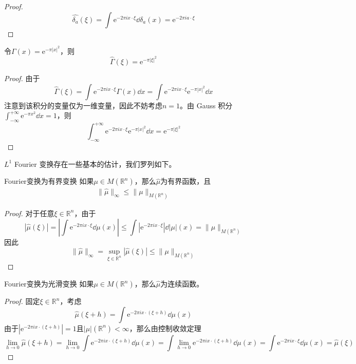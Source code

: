 \documentclass[lang = cn, %
scheme = chinese          %
]
{elegantbook}             %
\newcommand{\R}{\mathbb{R}}            %
\newcommand{\ee}[1]{\mathrm{e}^{#1}}           %
\newcommand{\dis}{\displaystyle}
\begin{document}
\begin{proof}
	\[
	\widehat{\delta_a}(\xi)
	=\int\ee{-2\pi i x \cdot \xi}\dd \delta_a(x)
	=\ee{-2\pi i a\cdot \xi}
	\]
\end{proof}

\begin{example}
	令$\Gamma(x)=\ee{-\pi|x|^2}$，则
	\[
	\widehat{\Gamma}(\xi)=\ee{-\pi|\xi|^2}
	\]
\end{example}

\begin{proof}
	由于
	\[
	\widehat{\Gamma}(\xi)
	=\int\ee{-2\pi i x \cdot \xi}\Gamma(x)\dd x
	=\int\ee{-2\pi i x \cdot \xi}\ee{-\pi|x|^2}\dd x
	\]
	注意到该积分的变量仅为一维变量，因此不妨考虑$n=1$。由 Gauss 积分$\dis \int_{-\infty}^{+\infty}\ee{-\pi x^2}\dd x=1$，则
	\[
	\int_{-\infty}^{+\infty}\ee{-2\pi i x \cdot \xi}\ee{-\pi|x|^2}\dd x
	=\ee{-\pi|\xi|^2}
	\]
\end{proof}

$L^1$ Fourier 变换存在一些基本的估计，我们罗列如下。

\begin{proposition}{}{Fourier变换为有界变换}
	如果$\mu\in M(\R^n)$，那么$\widehat{\mu}$为有界函数，且
	\begin{gather}
		\label{2式}
		\|\widehat{\mu}\|_{\infty}
		\le\|\mu\|_{M(\R^n)}
	\end{gather}
\end{proposition}

\begin{proof}
	对于任意$\xi\in\R^n$，由于
	\[
	|\widehat{\mu}(\xi)|
	=\left| \int\ee{-2\pi i x \cdot \xi}\dd\mu(x) \right|
	\le\int|\ee{-2\pi i x \cdot \xi}|\dd|\mu|(x)
	=\|\mu\|_{M(\R^n)}
	\]
	因此
	\[
	\|\widehat{\mu}\|_{\infty}
	=\sup_{\xi\in\R^n}|\widehat{\mu}(\xi)|
	\le\|\mu\|_{M(\R^n)}
	\]
\end{proof}

\begin{proposition}{}{Fourier变换为光滑变换}
	如果$\mu\in M(\R^n)$，那么$\widehat{\mu}$为连续函数。
\end{proposition}

\begin{proof}
	固定$\xi\in\R^n$，考虑
	\[
	\widehat{\mu}(\xi+h)
	=\int\ee{-2\pi i x \cdot (\xi+h)}\dd\mu(x)
	\]
	由于$|\ee{-2\pi i x \cdot (\xi+h)}|=1$且$|\mu|(\R^n)<\infty$，那么由控制收敛定理
	\[
	\lim_{h\to 0}\widehat{\mu}(\xi+h)
	=\lim_{h\to 0}\int\ee{-2\pi i x \cdot (\xi+h)}\dd\mu(x)
	=\int\lim_{h\to 0}\ee{-2\pi i x \cdot (\xi+h)}\dd\mu(x)
	=\int\ee{-2\pi i x \cdot \xi}\dd\mu(x)
	=\widehat{\mu}(\xi)
	\]
\end{proof}
\end{document}

